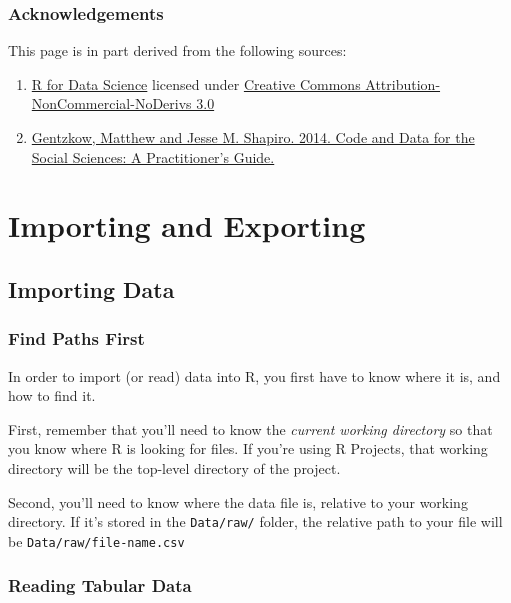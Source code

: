 \documentclass[]{book}
\begin{document}
\subsubsection*{Acknowledgements}\label{acknowledgements-1}

This page is in part derived from the following sources:

\begin{enumerate}
\def\labelenumi{\arabic{enumi}.}
\item
  \href{https://r4ds.had.co.nz}{R for Data Science} licensed under
  \href{https://creativecommons.org/licenses/by-nc-nd/3.0/us/}{Creative
  Commons Attribution-NonCommercial-NoDerivs 3.0}
\item
  \href{https://web.stanford.edu/~gentzkow/research/CodeAndData.pdf}{Gentzkow,
  Matthew and Jesse M. Shapiro. 2014. Code and Data for the Social
  Sciences: A Practitioner's Guide.}
\end{enumerate}

\section{Importing and Exporting}\label{importing-and-exporting}

\subsection{Importing Data}\label{importing-data}

\subsubsection*{Find Paths First}\label{find-paths-first}

In order to import (or read) data into R, you first have to know where
it is, and how to find it.

First, remember that you'll need to know the \emph{current working
directory} so that you know where R is looking for files. If you're
using R Projects, that working directory will be the top-level directory
of the project.

Second, you'll need to know where the data file is, relative to your
working directory. If it's stored in the \texttt{Data/raw/} folder, the
relative path to your file will be \texttt{Data/raw/file-name.csv}

\subsubsection*{Reading Tabular Data}\label{reading-tabular-data}
\end{document}
